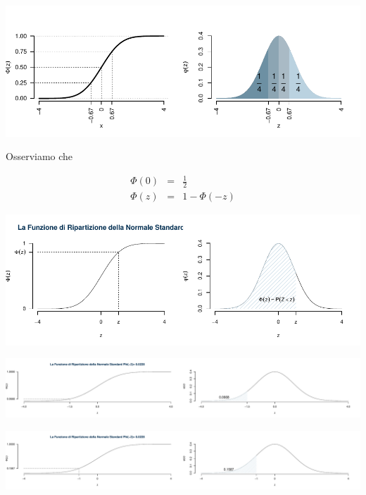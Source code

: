 \documentclass[
  11pt,
]{book}
\theoremstyle{mytheoremstyle}
\theoremstyle{mydefstyle}
\begin{document}
\begin{center}\includegraphics{Appunti_di_Statistica_2025_files/figure-latex/07c-Normale-7-1} \end{center}

Osserviamo che

\begin{eqnarray*}
  \Phi(0) &=&  \frac 1 2 \\
  \Phi(z) &=& 1- \Phi(-z)
\end{eqnarray*}

\begin{center}\includegraphics{Appunti_di_Statistica_2025_files/figure-latex/07c-Normale-8-1} \end{center}

\begin{center}\includegraphics{Appunti_di_Statistica_2025_files/figure-latex/07c-Normale-33-1} \end{center}

\begin{center}\includegraphics{Appunti_di_Statistica_2025_files/figure-latex/07c-Normale-33-2} \end{center}
\end{document}
